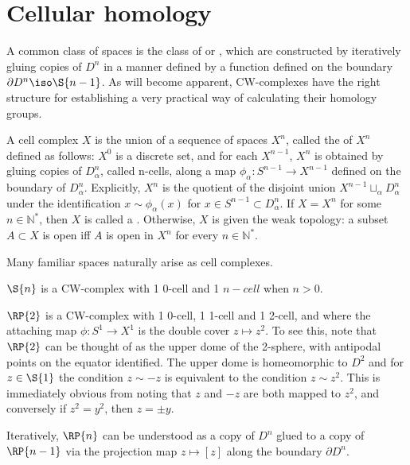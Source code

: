 \section{Cellular homology}
A common class of spaces is the class of  or , which are constructed by iteratively gluing copies of $D^n$ in a manner defined by a function defined on the boundary $\partial D^n \iso \S{n-1}$. As will become apparent, CW-complexes have the right structure for establishing a very practical way of calculating their homology groups.

\begin{definition}
A cell complex $X$ is the union of a sequence of spaces $X^n$, called the  of $X^n$ defined as follows: $X^0$ is a discrete set, and for each $X^{n-1}$, $X^{n}$ is obtained by gluing copies of $D_{\alpha}^n$, called n-cells, along a map $\phi_{\alpha}:S^{n-1}\rightarrow X^{n-1}$ defined on the boundary of $D_{\alpha}^n$. Explicitly, $X^n$ is the quotient of the disjoint union $X^{n-1}\sqcup_{\alpha} D_{\alpha}^n$ under the identification $x\sim \phi_{\alpha}(x)$ for $x\in S^{n-1}\subset D_{\alpha}^n$. If $X=X^n$ for some $n\in \mathbb{N}^*$, then $X$ is called a . Otherwise, $X$ is given the weak topology: a subset $A\subset X$ is open iff $A$ is open in $X^n$ for every $n\in \mathbb{N}^*$.
\end{definition}

Many familiar spaces naturally arise as cell complexes.

\begin{example}
$\S{n}$ is a CW-complex with 1 0-cell and 1 $n-cell$ when $n>0$. 
\end{example}

\begin{example}
$\RP{2}$ is a CW-complex with 1 0-cell, 1 1-cell and 1 2-cell, and where the attaching map $\phi:S^1\rightarrow X^1$ is the double cover $z\mapsto z^2$. To see this, note that $\RP{2}$ can be thought of as the upper dome of the 2-sphere, with antipodal points on the equator identified. The upper dome is homeomorphic to $D^2$ and for $z\in \S{1}$ the condition $z\sim -z$ is equivalent to the condition $z\sim z^2$. This is immediately obvious from noting that $z$ and $-z$ are both mapped to $z^2$, and conversely if $z^2=y^2$, then $z=\pm y$.

Iteratively, $\RP{n}$ can be understood as a copy of $D^n$ glued to a copy of $\RP{n-1}$ via the projection map $z\mapsto [z]$ along the boundary $\partial D^n$.
\end{example}

